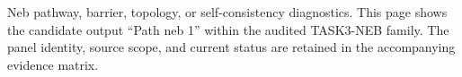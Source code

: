 Neb pathway, barrier, topology, or self-consistency diagnostics. This page shows the candidate output ``Path neb 1'' within the audited TASK3-NEB family. The panel identity, source scope, and current status are retained in the accompanying evidence matrix.
